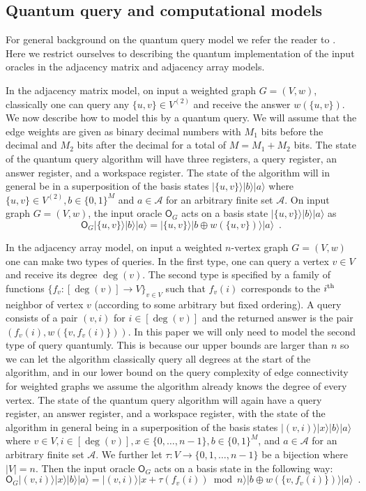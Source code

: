 \documentclass[10pt,a4paper]{article}
\newcommand{\Acal}{\mathcal{A}}
\newcommand{\ith}{i^{\scriptsize \mbox{{\rm th}}}}
\newcommand{\1}{\mathbf{1}}
\theoremstyle{definition}
\begin{document}
\subsection{Quantum query and computational models}
For general background on the quantum query model we refer the reader to \cite{HLS07}. 
Here we restrict ourselves to describing the quantum 
implementation of the input oracles in the adjacency matrix and adjacency array models.

In the adjacency matrix model, on input a weighted graph $G = (V,w)$, classically one can query any $\{u,v\} \in V^{(2)}$ and receive the answer 
$w(\{u,v\})$.  We now describe how to model this by a quantum query.  We will assume that the 
edge weights are given as binary decimal numbers with $M_1$ bits before the decimal and $M_2$ bits after the decimal for a total of $M = M_1 + M_2$ bits.  
The state of the quantum query 
algorithm will have three registers, a query register, an answer register, and a workspace register.  The 
state of the algorithm will in general be in a superposition of the basis states $|\{u,v\} \rangle |b \rangle | a \rangle$ where $\{u,v\} \in V^{(2)}, b \in \{0,1\}^M$ 
and $a \in \Acal$ for an arbitrary finite set $\Acal$.  
On input graph $G = (V,w)$, the input oracle $\mathsf{O}_G$ acts on a basis state $|\{u,v\} \rangle |b \rangle | a \rangle$ as
\[
\mathsf{O}_G |\{u,v\} \rangle |b \rangle | a \rangle = |\{u,v\} \rangle |b \oplus w(\{u,v\}) \rangle | a \rangle \enspace.
\]
 
In the adjacency array model, on input a weighted $n$-vertex graph $G = (V,w)$ one can make two types of queries.  In the first type, one can query a vertex $v \in V$ and receive its degree $\deg(v)$.
The second type is specified by a family of functions $\{f_v : [\deg(v)] \rightarrow V\}_{v \in V}$ such that $f_v(i)$ corresponds to the $\ith$ neighbor of vertex $v$ (according to some arbitrary but fixed ordering).  
A query consists of a pair $(v,i)$ for $i \in [\deg(v)]$ and the returned answer is the pair
$(f_v(i), w(\{v,f_v(i)\}))$.  In this paper we will only 
need to model the second type of query quantumly.  This is because our upper bounds are larger than $n$ so we can let the algorithm classically 
query all degrees at the start of the algorithm, and in our lower bound on the query complexity of edge connectivity for weighted graphs we assume the 
algorithm already knows the degree of every vertex.  
The state of the quantum query algorithm will again have a query register, an answer register, and a workspace register, with the state of the algorithm 
in general being in a superposition of the basis states $|(v,i)\rangle |x \rangle |b \rangle | a \rangle$ where $v \in V, i \in [\deg(v)], x \in \{0,\ldots, n-1\}, b \in \{0,1\}^M$, 
and $a \in \Acal$ for an arbitrary finite set $\Acal$.  We further let $\tau : V \rightarrow \{0,1,\ldots, n-1\}$ be a bijection where $|V| = n$.  Then the input oracle $\mathsf{O}_G$ acts on a basis state in the following way:
\[
\mathsf{O}_G |(v,i)\rangle |x \rangle |b \rangle | a \rangle = |(v,i) \rangle |x + \tau(f_v(i)) \bmod n \rangle |b \oplus w(\{v,f_v(i)\}) \rangle | a \rangle \enspace.
\]
\end{document}
